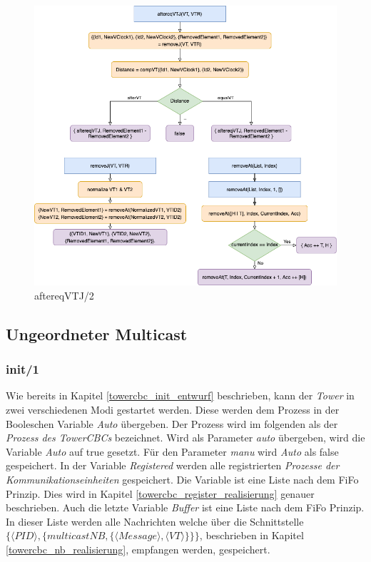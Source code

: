 \begin{figure}[htbp]
\begin{center}
\includegraphics[scale=0.55]{Latex/Bilder/aftereqVTJ_realisierung.png}
\caption{\label{fig:flow_aftereqvtj_realisierung} aftereqVTJ/2}
\end{center}
\end{figure}

\subsection{Ungeordneter Multicast}

\subsubsection{init/1}

Wie bereits in Kapitel \ref{towercbc_init_entwurf} beschrieben, kann der \textit{Tower} in zwei verschiedenen Modi gestartet werden. Diese werden dem Prozess in der Booleschen Variable \textit{Auto} übergeben. Der Prozess wird im folgenden als der \textit{Prozess des TowerCBCs} bezeichnet. Wird als Parameter \textit{auto} übergeben, wird die Variable \textit{Auto} auf true gesetzt. Für den Parameter \textit{manu} wird \textit{Auto} als false gespeichert. In der Variable \textit{Registered} werden alle registrierten \textit{Prozesse der Kommunikationseinheiten} gespeichert. Die Variable ist eine Liste nach dem FiFo Prinzip. Dies wird in Kapitel \ref{towercbc_register_realisierung} genauer beschrieben. Auch die letzte Variable \textit{Buffer} ist eine Liste nach dem FiFo Prinzip. In dieser Liste werden alle Nachrichten welche über die Schnittstelle $\{\langle PID\rangle,\{multicastNB,\{\langle Message\rangle,\langle VT\rangle\}\}\}$, beschrieben in Kapitel \ref{towercbc_nb_realisierung}, empfangen werden, gespeichert.

